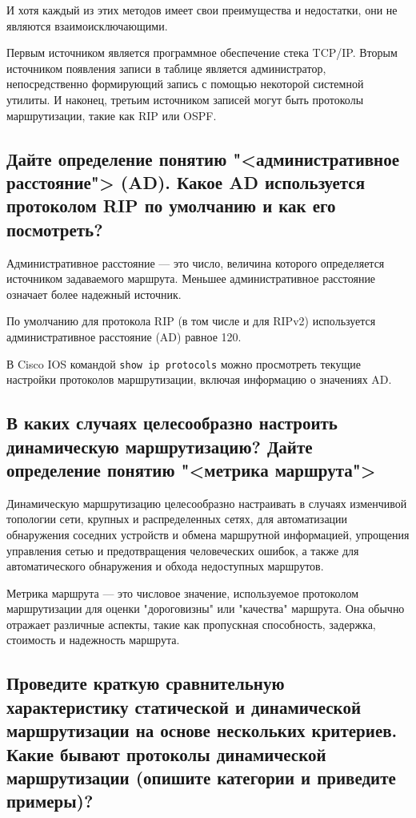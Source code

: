 И хотя каждый из этих методов имеет свои преимущества и недостатки,
они не являются взаимоисключающими.\par
Первым источником является программное обеспечение стека TCP/IP.
Вторым источником появления записи в таблице является администратор,
непосредственно формирующий запись с помощью некоторой системной утилиты.
И наконец, третьим источником записей могут быть протоколы маршрутизации,
такие как RIP или OSPF.

\subsection{Дайте определение понятию "<административное расстояние"> (AD).
Какое AD используется протоколом RIP по умолчанию и как его посмотреть?}

Административное расстояние --- это число,
величина которого определяется источником задаваемого маршрута.
Меньшее административное расстояние означает более надежный источник.\par
По умолчанию для протокола RIP (в том числе и для RIPv2)
используется административное расстояние (AD) равное 120.\par
В Cisco IOS командой \texttt{show ip protocols} можно просмотреть
текущие настройки протоколов маршрутизации, включая информацию о значениях AD.

\subsection{В каких случаях целесообразно настроить динамическую маршрутизацию?
Дайте определение понятию "<метрика маршрута">}

Динамическую маршрутизацию целесообразно настраивать
в случаях изменчивой топологии сети, крупных и распределенных сетях,
для автоматизации обнаружения соседних устройств
и обмена маршрутной информацией, упрощения управления сетью
и предотвращения человеческих ошибок,
а также для автоматического обнаружения и обхода недоступных маршрутов.\par
Метрика маршрута --- это числовое значение,
используемое протоколом маршрутизации для оценки "дороговизны"
или "качества" маршрута. Она обычно отражает различные аспекты,
такие как пропускная способность, задержка, стоимость и надежность маршрута.

\subsection{Проведите краткую сравнительную характеристику статической
и динамической маршрутизации на основе нескольких критериев.
Какие бывают протоколы динамической маршрутизации
    (опишите категории и приведите примеры)?}

